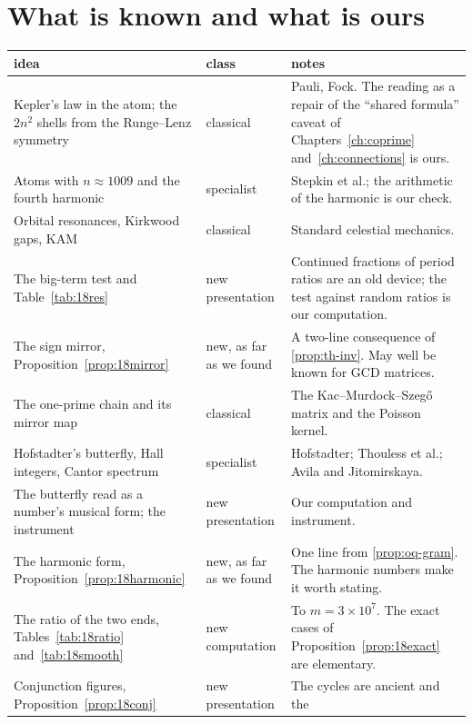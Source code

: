\section{What is known and what is ours}\label{sec:18audit}

\begin{table}[ht]
\centering
\small
\begin{tabular}{p{}p{}p{}}
\hline
idea & class & notes\\
\hline
Kepler's law in the atom; the $2n^{2}$ shells from the Runge--Lenz symmetry & classical & Pauli, Fock.
The reading as a repair of the ``shared formula'' caveat of Chapters~\ref{ch:coprime} and~\ref{ch:connections} is ours.\\
Atoms with $n\approx1009$ and the fourth harmonic & specialist & Stepkin et al.; the arithmetic of the
harmonic is our check.\\
Orbital resonances, Kirkwood gaps, KAM & classical & Standard celestial mechanics.\\
The big-term test and Table~\ref{tab:18res} & new presentation & Continued fractions of period ratios are
an old device; the test against random ratios is our computation.\\
The sign mirror, Proposition~\ref{prop:18mirror} & new, as far as we found & A two-line consequence of
\cref{prop:th-inv}. May well be known for GCD matrices.\\
The one-prime chain and its mirror map & classical & The Kac--Murdock--Szeg\H{o} matrix and the Poisson
kernel.\\
Hofstadter's butterfly, Hall integers, Cantor spectrum & specialist & Hofstadter; Thouless et al.; Avila
and Jitomirskaya.\\
The butterfly read as a number's musical form; the instrument & new presentation & Our computation and
instrument.\\
The harmonic form, Proposition~\ref{prop:18harmonic} & new, as far as we found & One line from
\cref{prop:oq-gram}. The harmonic numbers make it worth stating.\\
The ratio of the two ends, Tables~\ref{tab:18ratio} and~\ref{tab:18smooth} & new computation & To
$m=3\times10^{7}$. The exact cases of Proposition~\ref{prop:18exact} are elementary.\\
Conjunction figures, Proposition~\ref{prop:18conj} & new presentation & The cycles are ancient and the

\end{tabular}
\end{table}
